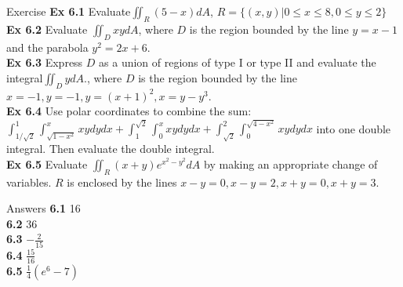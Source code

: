 \documentclass[aspectratio=169, UTF8]{beamer}
\begin{document}
\begin{frame}{Exercise}
    \textbf{Ex 6.1 }Evaluate$\iint_R(5-x)dA$, $R=\{(x,y)|0\leq x
        \leq 8,0\leq y\leq2\}$\\

    \textbf{Ex 6.2 }Evaluate $\iint_DxydA$, where $D$ is the region bounded by the line $y=x-1$ and the parabola $y^2=2x+6$.\\

    \textbf{Ex 6.3 }Express $D$ as a union of regions of type I or type II and evaluate the integral$\iint_D ydA$., where $D$ is the region bounded by the line $x=-1,y=-1,y=(x+1)^2,x=y-y^3$.\\

    \textbf{Ex 6.4} Use polar coordinates to combine the sum:
    $\int_{1/\sqrt{2}}^1\int_{\sqrt{1-x^2}}^xxydydx+\int_1^{\sqrt{2}}\int_0^xxydydx+\int_{\sqrt{2}}^2\int_0^{\sqrt{4-x^2}}xydydx$ into one double integral. Then evaluate the double integral.\\

    \textbf{Ex 6.5} Evaluate $\iint_R(x+y)e^{x^2-y^2}dA$ by making an appropriate change of variables. $R$ is enclosed by the lines $x-y=0,x-y=2,x+y=0,x+y=3$.
\end{frame}
\begin{frame}{Answers}
    \textbf{6.1} 16\\
    \textbf{6.2} 36\\
    \textbf{6.3} $-\frac{2}{15}$\\
    \textbf{6.4} $\frac{15}{16}$\\
    \textbf{6.5} $\frac{1}{4}(e^6-7)$
\end{frame}
\end{document}
